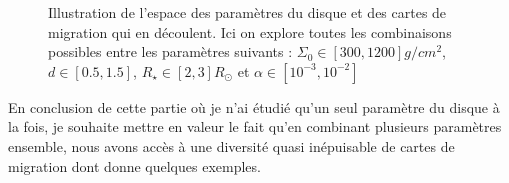 \begin{figure}[htbp]
\hfill
{}\hfill
{}\hfill
{}\hfill
\caption[Cartes de migration. Exploration de l'espace des paramètres.]{Illustration de l'espace des paramètres du disque et des
cartes de migration qui en découlent. Ici on explore toutes les combinaisons possibles entre les paramètres suivants :
$\Sigma_0\in[300, 1200]\unit{g/cm^2}$, $d\in[0.5, 1.5]$, $R_\star\in[2, 3]R_\odot$ et $\alpha\in[10^{-3},
10^{-2}]$}\label{fig:parameter_space}
\end{figure}

En conclusion de cette partie où je n'ai étudié qu'un seul paramètre du disque à la fois, je souhaite mettre en valeur le fait qu'en combinant plusieurs paramètres ensemble, nous avons accès à une diversité quasi inépuisable de cartes de migration dont  donne quelques exemples. 

